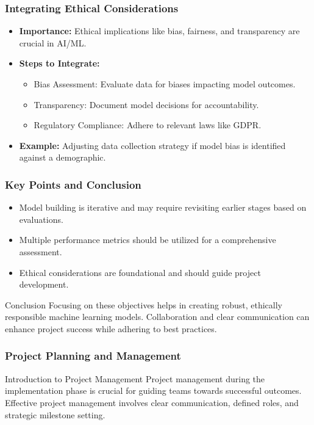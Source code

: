 \documentclass[aspectratio=169]{beamer}
\begin{document}
\begin{frame}[fragile]
    \frametitle{Integrating Ethical Considerations}
    \begin{itemize}
        \item \textbf{Importance:} Ethical implications like bias, fairness, and transparency are crucial in AI/ML.
        \item \textbf{Steps to Integrate:}
        \begin{itemize}
            \item Bias Assessment: Evaluate data for biases impacting model outcomes.
            \item Transparency: Document model decisions for accountability.
            \item Regulatory Compliance: Adhere to relevant laws like GDPR.
        \end{itemize}
        \item \textbf{Example:} Adjusting data collection strategy if model bias is identified against a demographic.
    \end{itemize}
\end{frame}

\begin{frame}[fragile]
    \frametitle{Key Points and Conclusion}
    \begin{itemize}
        \item Model building is iterative and may require revisiting earlier stages based on evaluations.
        \item Multiple performance metrics should be utilized for a comprehensive assessment.
        \item Ethical considerations are foundational and should guide project development.
    \end{itemize}
    \begin{block}{Conclusion}
        Focusing on these objectives helps in creating robust, ethically responsible machine learning models. 
        Collaboration and clear communication can enhance project success while adhering to best practices.
    \end{block}
\end{frame}

\begin{frame}[fragile]
    \frametitle{Project Planning and Management}
    \begin{block}{Introduction to Project Management}
        Project management during the implementation phase is crucial for guiding teams towards successful outcomes. 
        Effective project management involves clear communication, defined roles, and strategic milestone setting.
    \end{block}
\end{frame}
\end{document}
